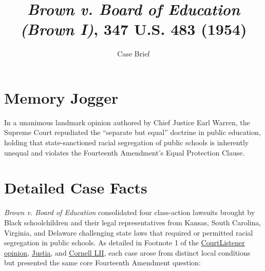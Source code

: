 \documentclass[12pt]{article}
\title{\textit{Brown v. Board of Education (Brown I)}, 347 U.S. 483 (1954)}
\subtitle{Case Brief}
\author{}
\date{}
\begin{document}
\maketitle

\section{Memory Jogger}

In a unanimous landmark opinion authored by Chief Justice Earl Warren, the Supreme Court repudiated the ``separate but equal'' doctrine in public education, holding that state-sanctioned racial segregation of public schools is inherently unequal and violates the Fourteenth Amendment's Equal Protection Clause.

\section{Detailed Case Facts}

\textit{Brown v. Board of Education} consolidated four class-action lawsuits brought by Black schoolchildren and their legal representatives from Kansas, South Carolina, Virginia, and Delaware challenging state laws that required or permitted racial segregation in public schools. As detailed in Footnote 1 of the \href{https://www.courtlistener.com/opinion/105221/brown-v-board-of-education/}{CourtListener opinion}, \href{https://supreme.justia.com/cases/federal/us/347/483/}{Justia}, and \href{https://www.law.cornell.edu/supremecourt/text/347/483/USSC_PRO_347_483_1}{Cornell LII}, each case arose from distinct local conditions but presented the same core Fourteenth Amendment question:
\end{document}
